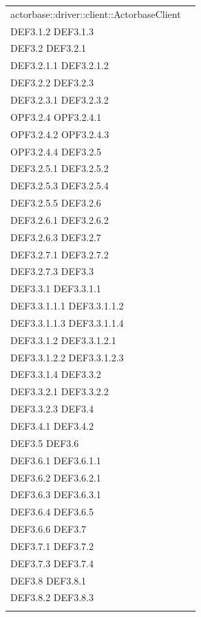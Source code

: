 \documentclass{scalatekids-article}
\begin{document}
\begin{longtable}[H]{|p{11.5cm}|p{5.5cm}|}
actorbase::driver::client::ActorbaseClient & \multiLineCell[t]{DEF3.1 DEF3.1.1\\DEF3.1.2 DEF3.1.3\\DEF3.2 DEF3.2.1\\DEF3.2.1.1 DEF3.2.1.2\\DEF3.2.2 DEF3.2.3\\DEF3.2.3.1 DEF3.2.3.2\\OPF3.2.4 OPF3.2.4.1\\OPF3.2.4.2 OPF3.2.4.3\\OPF3.2.4.4 DEF3.2.5\\DEF3.2.5.1 DEF3.2.5.2\\DEF3.2.5.3 DEF3.2.5.4\\DEF3.2.5.5 DEF3.2.6\\DEF3.2.6.1 DEF3.2.6.2\\DEF3.2.6.3 DEF3.2.7\\DEF3.2.7.1 DEF3.2.7.2\\DEF3.2.7.3 DEF3.3\\DEF3.3.1 DEF3.3.1.1\\DEF3.3.1.1.1 DEF3.3.1.1.2\\DEF3.3.1.1.3 DEF3.3.1.1.4\\DEF3.3.1.2 DEF3.3.1.2.1\\DEF3.3.1.2.2 DEF3.3.1.2.3\\DEF3.3.1.4 DEF3.3.2\\DEF3.3.2.1 DEF3.3.2.2\\DEF3.3.2.3 DEF3.4\\DEF3.4.1 DEF3.4.2\\DEF3.5 DEF3.6\\DEF3.6.1 DEF3.6.1.1\\DEF3.6.2 DEF3.6.2.1\\DEF3.6.3 DEF3.6.3.1\\DEF3.6.4 DEF3.6.5\\DEF3.6.6 DEF3.7\\DEF3.7.1 DEF3.7.2\\DEF3.7.3 DEF3.7.4\\DEF3.8 DEF3.8.1\\DEF3.8.2 DEF3.8.3\\}\\
\hline

\end{longtable}
\end{document}
